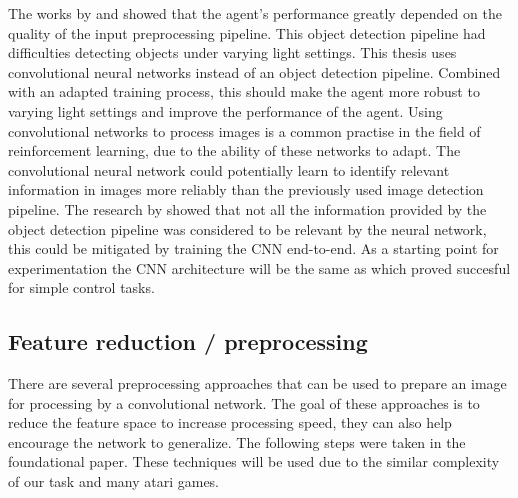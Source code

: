 The works by \autocite{merlin_flach} and \autocite{maximilian} showed that the agent's performance greatly depended on the quality of the input preprocessing pipeline. This object detection pipeline had difficulties detecting objects under varying light settings. This thesis uses convolutional neural networks instead of an object detection pipeline. Combined with an adapted training process, this should make the agent more robust to varying light settings and improve the performance of the agent.
Using convolutional networks to process images is a common practise in the field of reinforcement learning, due to the ability of these networks to adapt. The convolutional neural network could potentially learn to identify relevant information in images more reliably than the previously used image detection pipeline. The research by \autocite{merlin_flach} showed that not all the information provided by the object detection pipeline was considered to be relevant by the neural network, this could be mitigated by training the CNN end-to-end.
As a starting point for experimentation the CNN architecture will be the same as \autocite{human_level_control} which proved succesful for simple control tasks.




\subsection{Feature reduction / preprocessing}

There are several preprocessing approaches that can be used to prepare an image for processing by a convolutional network. The goal of these approaches is to reduce the feature space to increase processing speed, they can also help encourage the network to generalize. The following steps were taken in the foundational \autocite{atari} paper. These techniques will be used due to the similar complexity of our task and many atari games.

